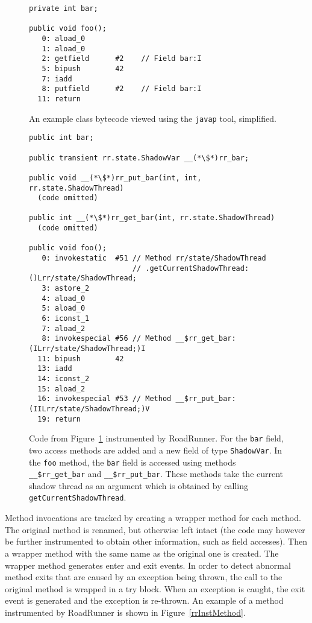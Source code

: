 \begin{figure}[hbt]
    \label{rrInstBefore}
    \begin{lstlisting}
private int bar;

public void foo();
   0: aload_0
   1: aload_0
   2: getfield      #2    // Field bar:I
   5: bipush        42
   7: iadd
   8: putfield      #2    // Field bar:I
  11: return\end{lstlisting}
    \caption{An example class bytecode viewed using the \texttt{javap} tool,
    simplified.}
\end{figure}

\begin{figure}[hbt]
    \label{rrInstField}
    \begin{lstlisting}
public int bar;

public transient rr.state.ShadowVar __(*\$*)rr_bar;

public void __(*\$*)rr_put_bar(int, int, rr.state.ShadowThread)
  (code omitted)

public int __(*\$*)rr_get_bar(int, rr.state.ShadowThread)
  (code omitted)

public void foo();
   0: invokestatic  #51 // Method rr/state/ShadowThread
                        // .getCurrentShadowThread:()Lrr/state/ShadowThread;
   3: astore_2
   4: aload_0
   5: aload_0
   6: iconst_1
   7: aload_2
   8: invokespecial #56 // Method __$rr_get_bar:(ILrr/state/ShadowThread;)I
  11: bipush        42
  13: iadd
  14: iconst_2
  15: aload_2
  16: invokespecial #53 // Method __$rr_put_bar:(IILrr/state/ShadowThread;)V
  19: return\end{lstlisting}
    \caption{Code from Figure~\ref{rrInstBefore} instrumented by RoadRunner. For
    the \texttt{bar} field, two access methods are added and a new field of type
    \texttt{ShadowVar}. In the \texttt{foo} method, the \texttt{bar} field is
    accessed using methods \texttt{\_\_\$rr\_get\_bar} and
    \texttt{\_\_\$rr\_put\_bar}. These methods take the current shadow thread as
    an argument which is obtained by calling \texttt{getCurrentShadowThread}.}
\end{figure}

Method invocations are tracked by creating a wrapper method for each method. The
original method is renamed, but otherwise left intact (the code may however be
further instrumented to obtain other information, such as field accesses). Then
a wrapper method with the same name as the original one is created. The wrapper
method generates enter and exit events. In order to detect abnormal method exits
that are caused by an exception being thrown, the call to the original method is
wrapped in a try block. When an exception is caught, the exit event is generated
and the exception is re-thrown. An example of a method instrumented by
RoadRunner is shown in Figure~\ref{rrInstMethod}.

